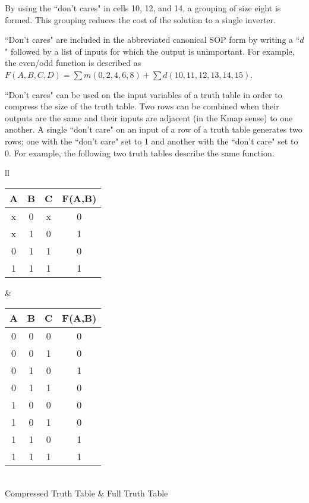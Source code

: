 \begin{changemargin}{1.5cm}{1.5cm}

By using the ``don't cares" in cells 10, 12, and 14, a grouping of
size eight is formed.  This grouping reduces the cost of the solution
to a single inverter.

``Don't cares" are included in the abbreviated canonical SOP form by
writing a ``$d$" followed by a list of inputs for which the output is
unimportant.  For example, the even/odd function is described
as $F(A,B,C,D) = \sum m(0,2,4,6,8) + \sum d(10,11,12,13,14,15)$.
\end{changemargin}

``Don't cares" can be used on the input variables of a truth table
in order to compress the size of the truth table.  Two rows can
be combined when their outputs are the same and their inputs are
adjacent (in the Kmap sense) to one another.  A single ``don't care"
on an input of a row of a truth table generates two rows; one
with the ``don't care" set to 1 and another with the ``don't care"
set to 0.  For example, the following two truth tables describe
the same function.

\begin{tabular}{ll}
\begin{tabular}{c|c|c||c}
A & B & C & F(A,B) \\ \hline
x & 0 & x & 0 \\ \hline
x & 1 & 0 & 1 \\ \hline
0 & 1 & 1 & 0 \\ \hline
1 & 1 & 1 & 1 \\
\end{tabular}

&

\begin{tabular}{c|c|c||c}
A & B & C & F(A,B) \\ \hline
0 & 0 & 0 & 0 \\ \hline
0 & 0 & 1 & 0 \\ \hline
0 & 1 & 0 & 1 \\ \hline
0 & 1 & 1 & 0 \\ \hline
1 & 0 & 0 & 0 \\ \hline
1 & 0 & 1 & 0 \\ \hline
1 & 1 & 0 & 1 \\ \hline
1 & 1 & 1 & 1 \\

\end{tabular}  \\
Compressed Truth Table & Full Truth Table \\
\end{tabular}

